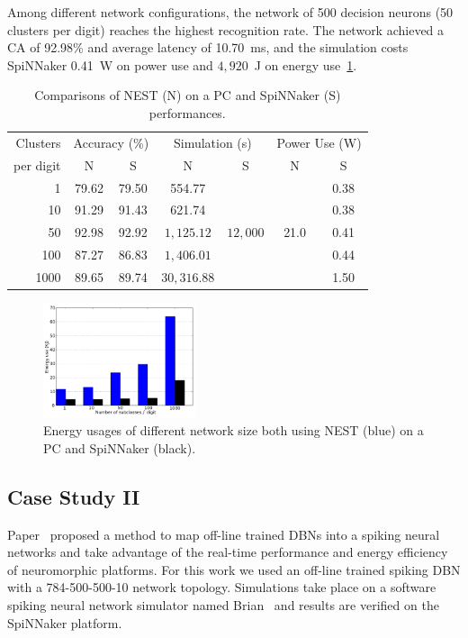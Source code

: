 \documentclass[journal]{journal}
\begin{document}
	Among different network configurations, the network of 500 decision neurons (50 clusters per digit) reaches the highest recognition rate.
	The network achieved a CA of 92.98\% and average latency of 10.70~ms, and the simulation costs SpiNNaker 0.41~W on power use and $4,920$~J on energy use~\ref{fig:energy}.
	
	\begin{table}[h]
	\caption{Comparisons of NEST (N) on a PC and SpiNNaker (S) performances.}
	\begin{center}
	\begin{tabular} {r|c|c|c|c|c|c}
		 Clusters
		 &\multicolumn{2}{c|}{Accuracy (\%)}  &\multicolumn{2}{c|}{Simulation (s)}
		 &\multicolumn{2}{c}{Power Use (W)}   \\
		 \cline{2-7}
		 per digit
		& N & S & N & S & N & S\\
	    \hline
	    1 & 79.62 & 79.50 & 554.77 & \multirow{5}{*}{$12,000$} & \multirow{5}{*}{ 21.0 } & 0.38 \\
	    10 & 91.29 & 91.43 & 621.74 &   &   & 0.38 \\
	    50 & 92.98 & 92.92 & $1,125.12$ &   &   & 0.41 \\
	    100 & 87.27 & 86.83 & $1,406.01$ &   &   & 0.44 \\
	    1000 & 89.65 & 89.74 & $30,316.88$ &   &   & 1.50 \\
	
	\end{tabular}
	\label{tbl:compare}
	\end{center}
	\end{table}
	
	\begin{figure}[hbt!]
		\centering
		\includegraphics[width=0.4\textwidth]{images/energy.pdf}
		\caption{Energy usages of different network size both using NEST (blue) on a PC and SpiNNaker (black).}
		\label{fig:energy}
	\end{figure}
	
	\subsection{Case Study II}
	Paper~\cite{o2013real} proposed a method to map off-line trained DBNs into a spiking neural networks and take advantage of the real-time performance and energy efficiency of neuromorphic platforms. 
	For this work we used an off-line trained spiking DBN with a 784-500-500-10 network topology.
	Simulations take place on a software spiking neural network simulator named Brian~\cite{goodman2008brian} and results are verified on the SpiNNaker platform.
	
\end{document}
